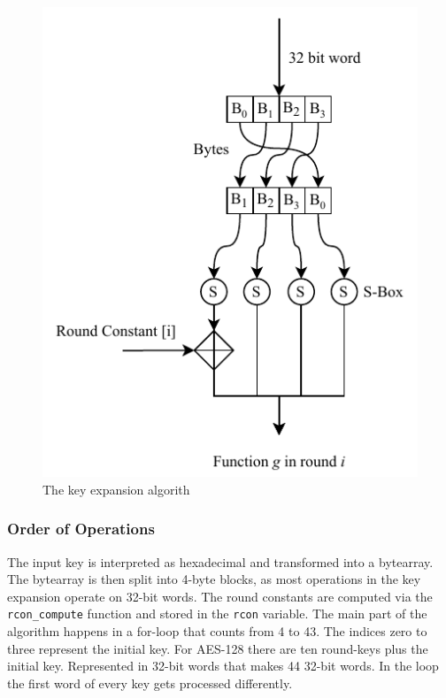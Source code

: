 \begin{figure}
\begin{minipage}{.35\textwidth}
    \includegraphics[width=\linewidth]{data/assets/g_function.pdf}
  \end{minipage}
  \caption{The key expansion algorith \cite{paar2016kryptografie}}
\end{figure}





\subsubsection{Order of Operations}
The input key is interpreted as hexadecimal and transformed into a bytearray. The bytearray is then split into 4-byte blocks, as most operations in the key expansion operate on 32-bit words. The round constants are computed via the  \lstinline{rcon_compute} function and stored in the  \lstinline{rcon} variable. The main part of the algorithm happens in a for-loop that counts from 4 to 43. The indices zero to three represent the initial key. For AES-128 there are ten round-keys plus the initial key. Represented in 32-bit words that makes 44 32-bit words. In the loop the first word of every key gets processed differently.

